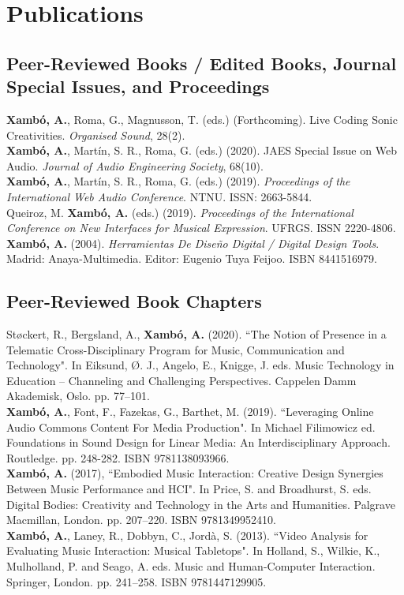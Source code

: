 \documentclass[10pt, a4paper]{article}
\newcommand{\years}[1]{\marginnote{\scriptsize #1}}
\begin{document}
\section*{Publications}

\subsection*{Peer-Reviewed Books / Edited Books, Journal Special Issues, and Proceedings}
\noindent

\years{2023}\textbf{Xambó, A.}, Roma, G., Magnusson, T. (eds.) (Forthcoming). Live Coding Sonic Creativities. \emph{Organised Sound}, 28(2).\\
\years{2020b}\textbf{Xambó, A.},  Martín, S. R., Roma, G. (eds.) (2020). JAES Special Issue on Web Audio. \emph{Journal of Audio Engineering Society}, 68(10).\\
\years{2020a}\textbf{Xambó, A.},  Martín, S. R., Roma, G. (eds.) (2019). \emph{Proceedings of the International Web Audio Conference}. NTNU. ISSN: 2663-5844.\\
\years{2019}Queiroz, M. \textbf{Xambó, A.} (eds.) (2019). \emph{Proceedings of the International Conference on New Interfaces for Musical Expression}. UFRGS. ISSN 2220-4806.\\
\years{2004}\textbf{Xambó, A.} (2004). \emph{Herramientas De Diseño Digital / Digital Design Tools}. Madrid: Anaya-Multimedia. Editor: Eugenio Tuya Feijoo. ISBN 8441516979.

\subsection*{Peer-Reviewed Book Chapters}
\noindent

\years{2020}Støckert, R., Bergsland, A., \textbf{Xambó, A.} (2020). “The Notion of Presence in a Telematic Cross-Disciplinary Program for Music, Communication and Technology". In Eiksund, Ø. J., Angelo, E., Knigge, J. eds. Music Technology in Education -- Channeling and Challenging Perspectives. Cappelen Damm Akademisk, Oslo. pp. 77--101.\\
\years{2019}\textbf{Xambó, A.}, Font, F., Fazekas, G., Barthet, M. (2019). “Leveraging Online Audio Commons Content For Media Production". In Michael Filimowicz ed. Foundations in Sound Design for Linear Media: An Interdisciplinary Approach. Routledge. pp. 248-282. ISBN 9781138093966.\\
\years{2016}\textbf{Xambó, A.} (2017), “Embodied Music Interaction: Creative Design Synergies Between Music Performance and HCI". In Price, S. and Broadhurst, S. eds. Digital Bodies: Creativity and Technology in the Arts and Humanities. Palgrave Macmillan, London. pp. 207--220. ISBN 9781349952410.\\
\years{2013}\textbf{Xambó, A.}, Laney, R., Dobbyn, C., Jordà, S. (2013). “Video Analysis for Evaluating Music Interaction: Musical Tabletops". In Holland, S., Wilkie, K., Mulholland, P. and Seago, A. eds. Music and Human-Computer Interaction. Springer, London. pp. 241--258. ISBN 9781447129905.
\end{document}
